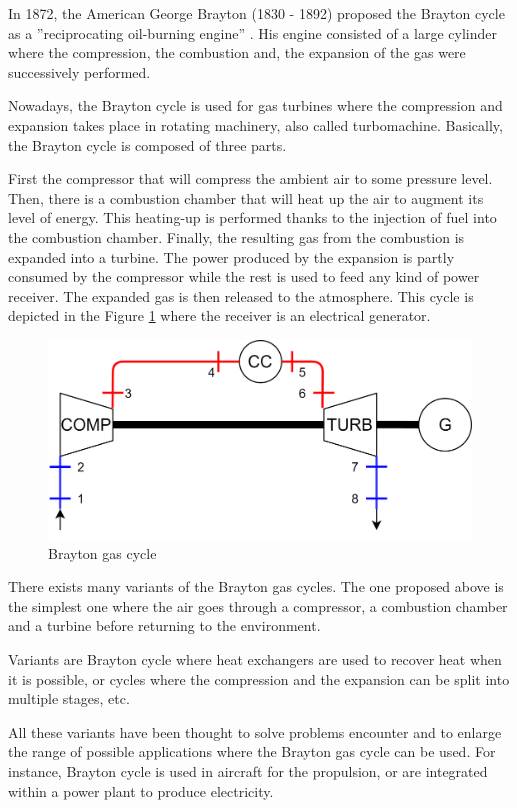 In 1872, the American George Brayton (1830 - 1892) proposed the Brayton cycle as a ''reciprocating oil-burning engine'' \cite{Boles2006}. His engine consisted of a large cylinder where the compression, the combustion and, the expansion of the gas were successively performed. 

Nowadays, the Brayton cycle is used for gas turbines where the compression and expansion takes place in rotating machinery, also called turbomachine. Basically, the Brayton cycle is composed of three parts. 

First the compressor that will compress the ambient air to some pressure level. Then, there is a combustion chamber that will heat up the air to augment its level of energy. This heating-up is performed thanks to the injection of fuel into the combustion chamber. Finally, the resulting gas from the combustion is expanded into a turbine. The power produced by the expansion is partly consumed by the compressor while the rest is used to feed any kind of power receiver. The expanded gas is then released to the atmosphere. This cycle is depicted in the Figure \ref{fig:C1_GT} where the receiver is an electrical generator.

\begin{figure}[h]
    \centering
    \includegraphics[scale = 0.15]{Chapitre_1/Images/GT.png}
    \caption{Brayton gas cycle}
    \label{fig:C1_GT}
\end{figure}
There exists many variants of the Brayton gas cycles. The one proposed above is the simplest one where the air goes through a compressor, a combustion chamber and a turbine before returning to the environment. 

Variants are Brayton cycle where heat exchangers are used to recover heat when it is possible, or cycles where the compression and the expansion can be split into multiple stages, etc.

All these variants have been thought to solve problems encounter and to enlarge the range of possible applications where the Brayton gas cycle can be used. For instance, Brayton cycle is used in aircraft for the propulsion, or are integrated within a power plant to produce electricity.\\

